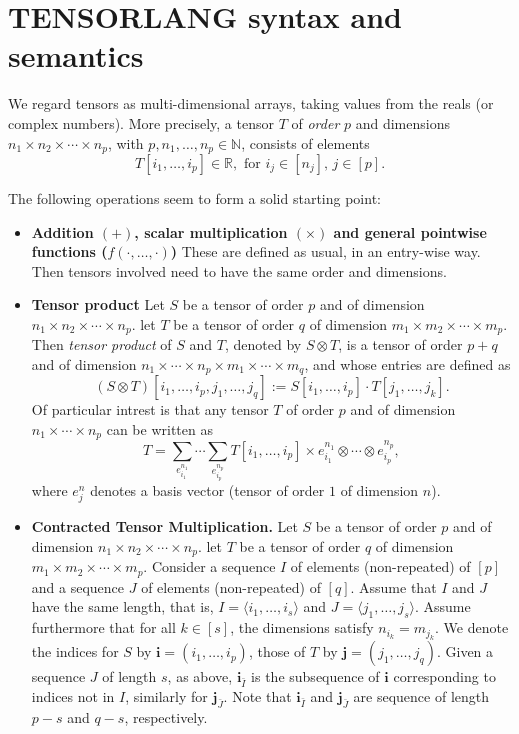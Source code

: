 \section{TENSORLANG syntax and semantics}\label{sec:tensorlang}


We regard tensors as multi-dimensional arrays, taking values from the reals (or complex numbers).
More precisely, a tensor $T$ of \textit{order} $p$ and dimensions $n_1\times n_2\times\cdots\times n_p$,
with $p,n_1,\ldots,n_p\in \mathbb{N}$, consists of elements
$$T[i_1,\ldots,i_p]\in\mathbb{R}, \text{ for $i_j\in [n_j]$, $j\in[p]$}.$$

The following operations seem to form a solid starting point:

\begin{itemize}
\item \textbf{Addition $(+)$, scalar multiplication $(\times)$ and general pointwise functions ($f(\cdot,\ldots,\cdot)$)} These are defined as usual, in an entry-wise way. Then tensors involved need to have the same order and dimensions.

\item \textbf{Tensor product} Let $S$ be a tensor of order $p$ and of dimension $n_1\times n_2\times\cdots\times n_p$. let 
$T$ be a tensor of order $q$ of dimension $m_1\times m_2\times\cdots\times m_p$. Then \textit{tensor product} of $S$ and $T$, denoted by $S\otimes T$, is a tensor of order $p+q$ and of dimension 
$n_1\times\cdots\times n_p\times m_1\times\cdots\times m_q$, and whose entries are defined as
$$
(S\otimes T)[i_1,\ldots,i_p,j_1,\ldots,j_q]:=S[i_1,\ldots,i_p]\cdot T[j_1,\ldots,j_k].
$$
Of particular intrest is that any tensor $T$ of order $p$ and of dimension $n_1\times\cdots\times n_p$ can be written as 
$$
T=\sum_{e_{i_1}^{n_1}}\cdots \sum_{e_{i_p}^{n_p}} T[i_1,\ldots,i_p]\times e_{i_1}^{n_1}\otimes \cdots \otimes e_{i_p}^{n_p},$$
where $e_j^n$ denotes a basis vector (tensor of order $1$ of dimension $n$).

\item \textbf{Contracted Tensor Multiplication.} Let $S$ be a tensor of order $p$ and of dimension $n_1\times n_2\times\cdots\times n_p$. let 
$T$ be a tensor of order $q$ of dimension $m_1\times m_2\times\cdots\times m_p$. Consider a sequence
$I$ of elements (non-repeated) of $[p]$ and a sequence $J$ of elements (non-repeated) of $[q]$. Assume that 
$I$ and $J$ have the same length, that is, $I=\langle i_1,\ldots,i_s\rangle$ and $J=\langle j_1,\ldots,j_s\rangle$. Assume furthermore that for all $k\in[s]$, the dimensions satisfy $n_{i_k}=m_{j_k}$. We denote the
indices for $S$ by $\mathbf{i}=(i_1,\ldots,i_p)$, those of $T$ by $\mathbf{j}=(j_1,\ldots,j_q)$. Given a sequence
$J$ of length $s$, as above, $\mathbf{i}_{\bar I}$ is the subsequence of $\mathbf{i}$ corresponding to indices not in $I$, similarly for $\mathbf{j}_{\bar J}$. Note that $\mathbf{i}_{\bar I}$ and $\mathbf{j}_{\bar J}$ are sequence of length $p-s$ and $q-s$, respectively.


\end{itemize}
